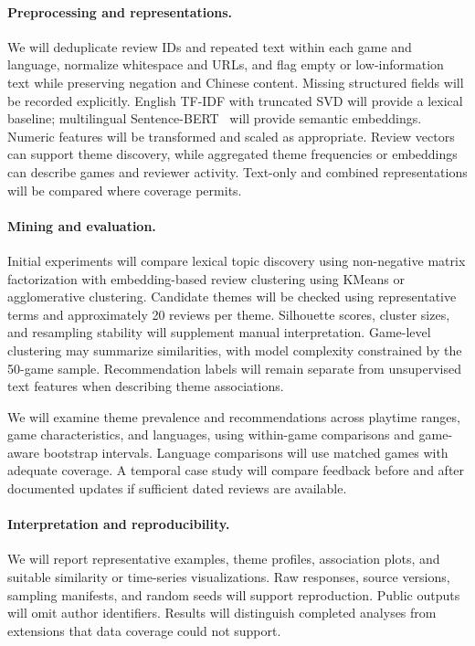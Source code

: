 \documentclass{article}
\begin{document}
\paragraph{Preprocessing and representations.}
We will deduplicate review IDs and repeated text within each game and language, normalize whitespace and URLs, and flag empty or low-information text while preserving negation and Chinese content. Missing structured fields will be recorded explicitly. English TF-IDF with truncated SVD will provide a lexical baseline; multilingual Sentence-BERT~\cite{sbert,multilingual} will provide semantic embeddings. Numeric features will be transformed and scaled as appropriate. Review vectors can support theme discovery, while aggregated theme frequencies or embeddings can describe games and reviewer activity. Text-only and combined representations will be compared where coverage permits.

\paragraph{Mining and evaluation.}
Initial experiments will compare lexical topic discovery using non-negative matrix factorization with embedding-based review clustering using KMeans or agglomerative clustering. Candidate themes will be checked using representative terms and approximately 20 reviews per theme. Silhouette scores, cluster sizes, and resampling stability will supplement manual interpretation. Game-level clustering may summarize similarities, with model complexity constrained by the 50-game sample. Recommendation labels will remain separate from unsupervised text features when describing theme associations.

We will examine theme prevalence and recommendations across playtime ranges, game characteristics, and languages, using within-game comparisons and game-aware bootstrap intervals. Language comparisons will use matched games with adequate coverage. A temporal case study will compare feedback before and after documented updates if sufficient dated reviews are available.

\paragraph{Interpretation and reproducibility.}
We will report representative examples, theme profiles, association plots, and suitable similarity or time-series visualizations. Raw responses, source versions, sampling manifests, and random seeds will support reproduction. Public outputs will omit author identifiers. Results will distinguish completed analyses from extensions that data coverage could not support.
\end{document}
